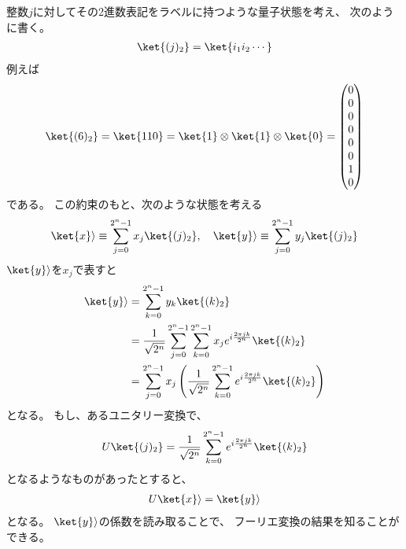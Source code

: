 \documentclass[]{ltjsarticle}
\begin{document}
整数$j$に対してその2進数表記をラベルに持つような量子状態を考え、
次のように書く。
\begin{align}
    \ket{(j)_2} = \ket{i_1 i_2 \cdots}
\end{align}
例えば
\begin{align}
    \ket{(6)_2} 
    = 
    \ket{110} 
    = 
    \ket{1} \otimes \ket{1} \otimes \ket{0} 
    =
    \begin{pmatrix}
        0 \\ 0 \\ 0 \\ 0 \\ 0 \\ 0 \\ 1 \\ 0
    \end{pmatrix}
\end{align}
である。
この約束のもと、次のような状態を考える
\begin{align}
    \ket{x}\rangle 
    \equiv 
    \sum_{j=0}^{2^n-1} x_j \ket{(j)_2}, \quad
    \ket{y}\rangle 
    \equiv 
    \sum_{j=0}^{2^n-1} y_j \ket{(j)_2}
\end{align}
$\ket{y}\rangle$を$x_j$で表すと
\begin{align}
    \ket{y}\rangle 
    &=
    \sum_{k=0}^{2^n-1} y_k \ket{(k)_2} \\
    &=
    \frac{1}{\sqrt{2^n}}
    \sum_{j=0}^{2^n-1}     
    \sum_{k=0}^{2^n-1}
    x_j e^{i\frac{2\pi jk}{2^n}}
    \ket{(k)_2} \\
    &=
    \sum_{j=0}^{2^n-1}     
    x_j
    \left(
        \frac{1}{\sqrt{2^n}}
        \sum_{k=0}^{2^n-1}
        e^{i\frac{2\pi jk}{2^n}}
        \ket{(k)_2}    
    \right)
\end{align}
となる。
もし、あるユニタリー変換で、
\begin{align}
    U \ket{(j)_2}
    =
    \frac{1}{\sqrt{2^n}}
    \sum_{k=0}^{2^n-1}
    e^{i\frac{2\pi jk}{2^n}}
    \ket{(k)_2}    
\end{align}
となるようなものがあったとすると、
\begin{align}
    U \ket{x}\rangle 
    =
    \ket{y}\rangle
\end{align}
となる。
$\ket{y}\rangle$の係数を読み取ることで、
フーリエ変換の結果を知ることができる。
\end{document}
